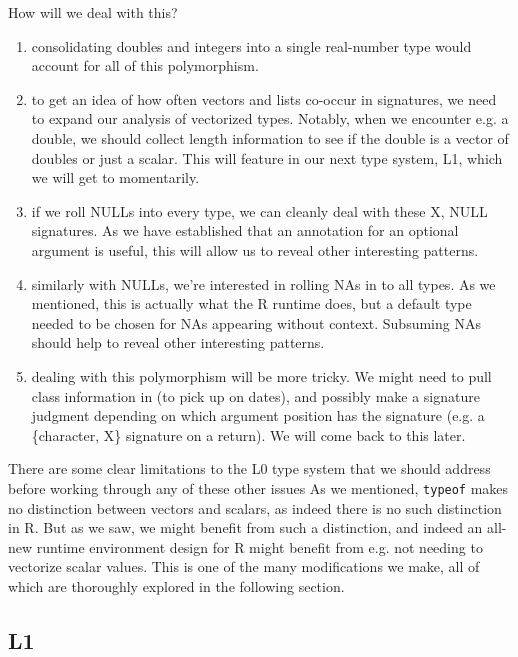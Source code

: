 \documentclass[acmsmall,10pt,review,anonymous]{acmart}\settopmatter{printfolios=true,printccs=false,printacmref=false}
\newcommand{\code}[1]{\lstinline|#1|\xspace}
\begin{document}
How will we deal with this?

\begin{enumerate}

	\item consolidating doubles and integers into a single real-number type would account for all of this polymorphism.
	
	\item to get an idea of how often vectors and lists co-occur in signatures, we need to expand our analysis of vectorized types.
	Notably, when we encounter e.g. a double, we should collect length information to see if the double is a vector of doubles or just a scalar.
	This will feature in our next type system, L1, which we will get to momentarily.
	
	\item if we roll NULLs into every type, we can cleanly deal with these X, NULL signatures.
	As we have established that an annotation for an optional argument is useful, this will allow us to reveal other interesting patterns.
	
	\item similarly with NULLs, we're interested in rolling NAs in to all types.
	As we mentioned, this is actually what the R runtime does, but a default type needed to be chosen for NAs appearing without context.
	Subsuming NAs should help to reveal other interesting patterns.
		
	\item dealing with this polymorphism will be more tricky.
	We might need to pull class information in (to pick up on dates), and possibly make a signature judgment depending on which argument position has the signature (e.g. a \{character, X\} signature on a return).
	We will come back to this later.

\end{enumerate}

There are some clear limitations to the L0 type system that we should address before working through any of these other issues
As we mentioned, \code{typeof} makes no distinction between vectors and scalars, as indeed there is no such distinction in R. 
But as we saw, we might benefit from such a distinction, and indeed an all-new runtime environment design for R might benefit from e.g. not needing to vectorize scalar values.
This is one of the many modifications we make, all of which are thoroughly explored in the following section.
%
%
%
%
\subsection{L1}
\end{document}
